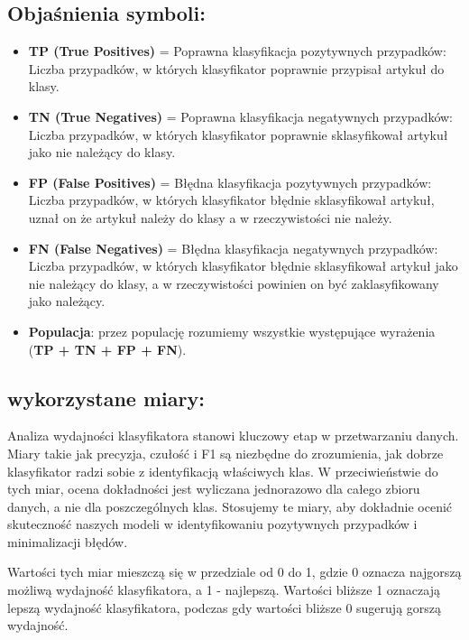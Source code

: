 \documentclass{article}
\begin{document}
\subsection*{Objaśnienia symboli:}
\begin{itemize}

    \item \textbf{TP (True Positives)} = Poprawna klasyfikacja pozytywnych przypadków: Liczba przypadków, w których klasyfikator poprawnie przypisał artykuł do klasy.
    
    \item \textbf{TN (True Negatives)} = Poprawna klasyfikacja negatywnych przypadków: Liczba przypadków, w których klasyfikator poprawnie sklasyfikował artykuł jako nie należący do klasy.
    
    \item \textbf{FP (False Positives)} = Błędna klasyfikacja pozytywnych przypadków: Liczba przypadków, w których klasyfikator błędnie sklasyfikował artykuł, uznał on że artykuł należy do klasy a w rzeczywistości nie należy.
    
    \item \textbf{FN (False Negatives)} = Błędna klasyfikacja negatywnych przypadków: Liczba przypadków, w których klasyfikator błędnie sklasyfikował artykuł jako nie należący do klasy, a w rzeczywistości powinien on być zaklasyfikowany jako należący.
    
    \item \textbf{Populacja}: przez populację rozumiemy wszystkie występujące wyrażenia (\textbf{TP + TN + FP + FN}).
\end{itemize}

\subsection*{wykorzystane miary:} 

Analiza wydajności klasyfikatora stanowi kluczowy etap w przetwarzaniu danych. Miary takie jak precyzja, czułość i F1 są niezbędne do zrozumienia, jak dobrze klasyfikator radzi sobie z identyfikacją właściwych klas. W przeciwieństwie do tych miar, ocena dokładności jest wyliczana jednorazowo dla całego zbioru danych, a nie dla poszczególnych klas. Stosujemy te miary, aby dokładnie ocenić skuteczność naszych modeli w identyfikowaniu pozytywnych przypadków i minimalizacji błędów.\newline

\noindent Wartości tych miar mieszczą się w przedziale od 0 do 1, gdzie 0 oznacza najgorszą możliwą wydajność klasyfikatora, a 1 - najlepszą. Wartości bliższe 1 oznaczają lepszą wydajność klasyfikatora, podczas gdy wartości bliższe 0 sugerują gorszą wydajność.
\end{document}
